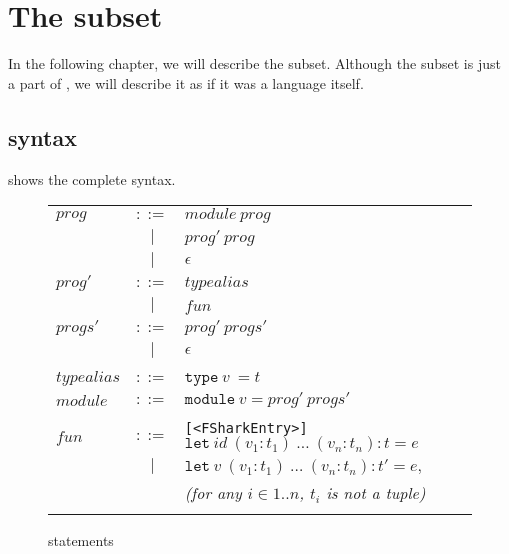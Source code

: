 \chapter{The \fshark{} subset}
\label{chap:fsharklanguage}
In the following chapter, we will describe the \fshark{} subset. Although the
subset is just a part of \fsharp{}, we will describe it as if it was a language
itself.
\clearpage
\section{\fshark{} syntax}
shows the complete \fshark{} syntax.

\begin{figure}[h]
  \centering
  \begin{tabular}{lclr}
    $prog$ & $::=$ & $module\ prog$ & \\
           & $|$   & $prog'\ prog$  & \\
           & $|$   & $\epsilon$     & \\

    $prog'$ & $::=$ & $typealias$   & \\
            & $|$   & $fun$ & \\

    $progs'$ & $::=$ & $prog'\ progs'$   & \\
             & $|$   & $\epsilon$ & \\
    \\
    $typealias$ & $::=$ & $\texttt{type}\ v\ = t $& \\
    $module$ & $::=$ & $\texttt{module}\ v = prog'\ progs'$ & \\
    \\
    $fun$ & $::=$ & \texttt{[<FSharkEntry>]} $\texttt{let}\ id\ (v_1 : t_1)\ \ldots\ (v_n : t_n) : t = e$ & \\
        & $|$   & $\texttt{let}\ v\ (v_1 : t_1)\ \ldots\ (v_n : t_n) : t' = e,$ & \\
        &       & \hspace{1em} \textit{(for any $i \in {1..n}$, $t_i$ is not a tuple)} \\
    \\

  \end{tabular}
  \caption{\fshark{} statements}
  \label{fig:fsharkstatements}
\end{figure}




